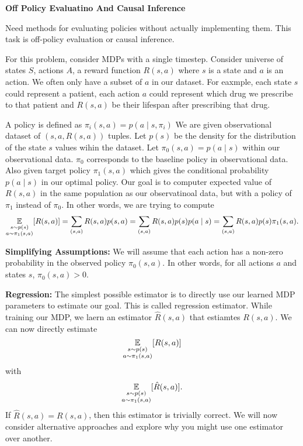 \documentclass[12pt,letterpaper,boxed]{hmcpset}
\begin{document}
\begin{problem}[Problem 2]
  \textbf{Off Policy Evaluatino And Causal Inference}

  Need methods for evaluating policies without actually implementing them. This task is off-policy evaluation or causal inference.

  For this problem, consider MDPs with a single timestep. Consider universe of states $S$, actions $A$, a reward function $R(s, a)$ where $s$ is a state and $a$ is an action. We often only have a subset of $a$ in our dataset. For eaxmple, each state $s$ could represent a patient, each action $a$ could represent which drug we prescribe to that patient and $R(s, a)$ be their lifespan after prescribing that drug.

  A policy is defined as $\pi_i (s, a) = p(a \mid s, \pi_i)$ We are given observational dataset of $(s, a, R(s, a))$ tuples. Let $p(s)$ be the density for the distribution of the state $s$ values wihin the dataset. Let $\pi_0 (s, a) = p(a \mid s)$ within our observational data. $\pi_0$ corresponds to the baseline policy in observational data. Also given target policy $\pi_1 (s,a)$ which gives the conditional probability $p(a \mid s)$ in our optimal policy. Our goal is to computer expected value of $R(s,a)$ in the same population as our observatinoal data, but with a policy of $\pi_1$ instead of $\pi_0$. In other words, we are trying to compute
  \[
  \operatorname*{\mathbb{E}}_{\substack{s \sim p(s) \\ a \sim \pi_1(s,a)}} [R(s, a)] = \sum_{(s,a)} R(s,a) p(s,a) = \sum_{(s,a)} R(s,a) p(s) p(a \mid s) = \sum_{(s,a)} R(s,a) p(s) \pi_1 (s,a).
  \]

  \textbf{Simplifying Assumptions: } We will assume that each action has a non-zero probability in the observed policy $\pi_0 (s, a)$. In other words, for all actions $a$ and states $s$, $\pi_0 (s,a) > 0$.

  \textbf{Regression:} The simplest possible estimator is to directly use our learned MDP parameters to estimate our goal. This is called regression estimator. While training our MDP, we laern an estimator $\hat R(s,a)$ that estiamtes $R(s,a)$. We can now directly estimate
  \[
  \operatorname*{\mathbb{E}}_{\substack{s \sim p(s) \\ a \sim \pi_1(s,a)}} [R(s, a)]
  \]
  with 
  \[
    \operatorname*{\mathbb{E}}_{\substack{s \sim p(s) \\ a \sim \pi_1(s,a)}} [\hat R(s, a)].
  \]
  If $\hat R(s,a) = R(s,a)$, then this estimator is trivially correct. We will now consider alternative approaches and explore why you might use one estimator over another.
\end{problem}
\end{document}
